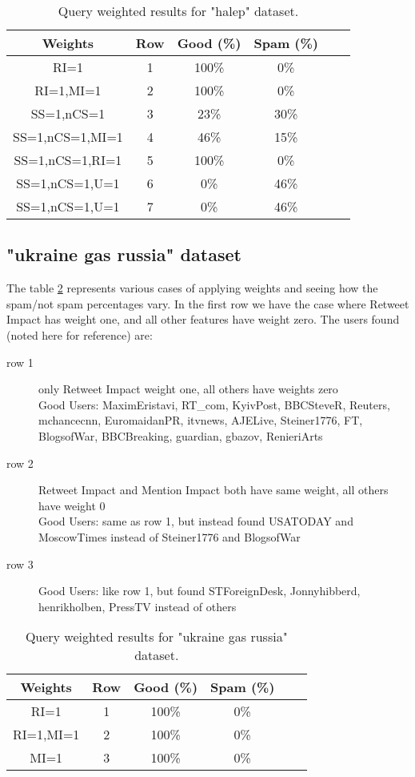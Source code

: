 \begin{table}[!h]
\centering
\setlength{\tabcolsep}{12pt}
\begin{tabular}{| c | c | c | c | c | c |}
\hline
Weights 	& Row 	& Good (\%) & Spam (\%) \\
\hline
RI=1		& 1		& 100\%		& 0\%		\\
\hline
RI=1,MI=1	& 2		& 100\%		& 0\%		\\
\hline
SS=1,nCS=1	& 3		& 23\%		& 30\%		\\
\hline
SS=1,nCS=1,MI=1	& 4		& 46\%		& 15\%		\\
\hline
SS=1,nCS=1,RI=1	& 5		& 100\%		& 0\%		\\
\hline
SS=1,nCS=1,U=1	& 6		& 0\%		& 46\%		\\
\hline
SS=1,nCS=1,U=1	& 7		& 0\%		& 46\%		\\
\hline
\end{tabular}
\caption{Query weighted results for "halep" dataset.}
\label{table:weight-halep}
\end{table}

\subsection{"ukraine gas russia" dataset}


The table \ref{table:weight-ukraine} represents various cases of applying weights and seeing how the spam/not spam percentages vary. In the first row we have the case where Retweet Impact has weight one, and all other features have weight zero.
The users found (noted here for reference) are:
\begin{description}
	\item[row 1] only Retweet Impact weight one, all others have weights zero\\
    Good Users: MaximEristavi, RT\_com, KyivPost, BBCSteveR, Reuters, mchancecnn, EuromaidanPR, itvnews, AJELive, Steiner1776, FT, BlogsofWar, BBCBreaking, guardian, gbazov, RenieriArts
    \item[row 2] Retweet Impact and Mention Impact both have same weight, all others have weight 0\\
    Good Users: same as row 1, but instead found USATODAY and MoscowTimes instead of Steiner1776 and BlogsofWar
    \item[row 3]
    Good Users: like row 1, but found STForeignDesk, Jonnyhibberd, henrikholben, PressTV instead of others
\end{description}

\begin{table}[!h]
\centering
\setlength{\tabcolsep}{12pt}
\begin{tabular}{| c | c | c | c | c | c |}
\hline
Weights 	& Row 	& Good (\%) & Spam (\%) \\
\hline
RI=1		& 1		& 100\%		& 0\%		\\
\hline
RI=1,MI=1	& 2		& 100\%		& 0\%		\\
\hline
MI=1	& 3		& 100\%		& 0\%		\\
\hline
\end{tabular}
\caption{Query weighted results for "ukraine gas russia" dataset.}
\label{table:weight-ukraine}
\end{table}

